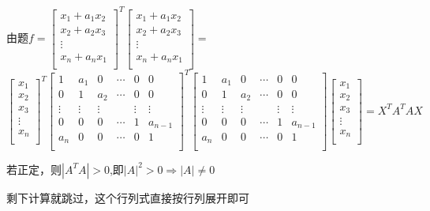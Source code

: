 \documentclass[lang=cn,10pt]{elegantbook}
\begin{document}
\begin{solution}
	
	由题$f=\left[ \begin{array}{c}
		x_1+a_1x_2\\
		x_2+a_2x_3\\
		\vdots\\
		x_n+a_nx_1\\
	\end{array} \right]^{T}\left[ \begin{array}{c}
	x_1+a_1x_2\\
	x_2+a_2x_3\\
	\vdots\\
	x_n+a_nx_1\\
	\end{array} \right] =	$ $
	
	\left[ \begin{array}{c}
	x_1\\
	x_2\\
	x_3\\
	\vdots\\
	x_n\\
	\end{array} \right] ^{T}
	\left[ \begin{matrix}
	1&		a_1&		0&		\cdots&		0&		0\\
	0&		1&		a_2&		\cdots&		0&		0\\
	\vdots&		\vdots&		\vdots&		&		\vdots&		\vdots\\
	0&		0&		0&		\cdots&		1&		a_{n-1}\\
	a_n&		0&		0&		\cdots&		0&		1\\
	\end{matrix} \right] ^{T}
	\left[ \begin{matrix}
	1&		a_1&		0&		\cdots&		0&		0\\
	0&		1&		a_2&		\cdots&		0&		0\\
	\vdots&		\vdots&		\vdots&		&		\vdots&		\vdots\\
	0&		0&		0&		\cdots&		1&		a_{n-1}\\
	a_n&		0&		0&		\cdots&		0&		1\\
	\end{matrix} \right] \left[ \begin{array}{c}
	x_1\\
	x_2\\
	x_3\\
	\vdots\\
	x_n\\
	\end{array} \right]  
	=X^{T}A^{T}AX$
	
	若正定，则$|A^{T}A|>0$,即$|A|^{2}>0$$\Rightarrow|A|\ne0$
	
	剩下计算就跳过，这个行列式直接按行列展开即可
\end{solution}
\end{document}
